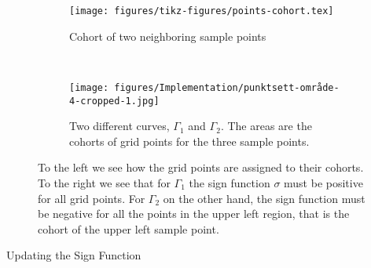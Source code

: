 \begin{figure}
    \centering
    \begin{subfigure}[b]{0.2\linewidth}
        \centering
        \texttt{[image: figures/tikz-figures/points-cohort.tex]}
        \caption{Cohort of two neighboring sample points}
        \label{fig:grid-to-point}
    \end{subfigure}
    ~
    \begin{subfigure}[b]{0.7\linewidth}
    \centering
        \texttt{[image: figures/Implementation/punktsett-område-4-cropped-1.jpg]}
        \caption{Two different curves, $\Gamma_1$ and $\Gamma_2$. The areas are the cohorts of grid points for the three sample points.}
        \label{fig:pointset-with-area}
    \end{subfigure}
    \caption[The Cohort of a Point Set]{To the left we see how the grid points are assigned to their cohorts. To the right we see that for $\Gamma_1$ the sign function $\sigma$ must be positive for all grid points. For $\Gamma_2$ on the other hand, the sign function must be negative for all the points in the upper left region, that is the cohort of the upper left sample point.}
    \label{fig:datastruc-pointset}
\end{figure}
\begin{algorithm}[H]
\SetAlgoLined
{}

 \caption{Updating the Sign Function}
 \label{alg:update-sigma}
\end{algorithm}